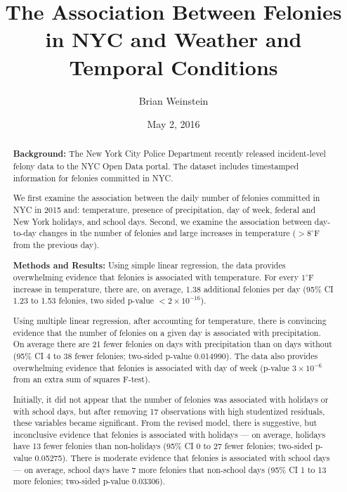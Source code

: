 \documentclass[11pt,notitlepage]{article}
\newcommand{\degf}{^\circ\text{F}}
\begin{document}
\title{The Association Between Felonies in NYC and Weather and Temporal Conditions}
\author{Brian Weinstein}
\date{May 2, 2016}

\maketitle



\begin{abstract}


\noindent \textbf{Background:} The New York City Police Department recently released incident-level felony data to the NYC Open Data portal. The dataset includes timestamped information for felonies committed in NYC.

We first examine the association between the daily number of felonies committed in NYC in 2015 and: temperature, presence of precipitation, day of week, federal and New York holidays, and school days. Second, we examine the association between day-to-day changes in the number of felonies and large increases in temperature ($>8 \degf$ from the previous day).

\noindent \textbf{Methods and Results:} Using simple linear regression, the data provides overwhelming evidence that felonies is associated with temperature. For every $1 \degf$ increase in temperature, there are, on average, 1.38 additional felonies per day (95\% CI 1.23 to 1.53 felonies, two sided p-value $<2\times10^{-16}$).

Using multiple linear regression, after accounting for temperature, there is convincing evidence that the number of felonies on a given day is associated with precipitation. On average there are 21 fewer felonies on days with precipitation than on days without (95\% CI 4 to 38 fewer felonies; two-sided p-value 0.014990). The data also provides overwhelming evidence that felonies is associated with day of week (p-value $3 \times 10^{-6}$ from an extra sum of squares F-test).

Initially, it did not appear that the number of felonies was associated with holidays or with school days, but after removing 17 observations with high studentized residuals, these variables became significant. From the revised model, there is suggestive, but inconclusive evidence that felonies is associated with holidays --- on average, holidays have 13 fewer felonies than non-holidays (95\% CI 0 to 27 fewer felonies; two-sided p-value 0.05275). There is moderate evidence that felonies is associated with school days --- on average, school days have 7 more felonies that non-school days (95\% CI 1 to 13 more felonies; two-sided p-value 0.03306).


\end{abstract}
\end{document}

